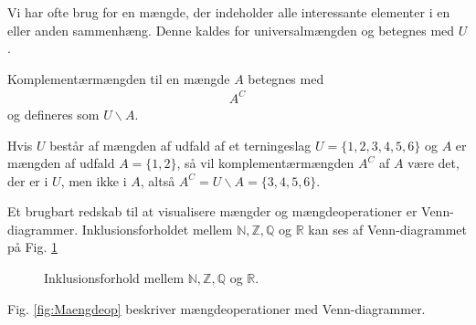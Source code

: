 Vi har ofte brug for en mængde, der indeholder alle interessante elementer i en eller anden sammenhæng. Denne kaldes for universalmængden og betegnes med $U$. 
\begin{defn}
Komplementærmængden til en mængde $A$ betegnes med 
\begin{align*}
A^C 
\end{align*}
og defineres som $U\backslash A$. 
\end{defn}
\begin{exa}
Hvis $U$ består af mængden af udfald af et terningeslag $U=\{1,2,3,4,5,6\}$ og $A$ er mængden af udfald $A=\{1,2\}$, så vil komplementærmængden $A^C$ af $A$ være det, der er i $U$, men ikke i $A$, altså $A^C = U\backslash A = \{3,4,5,6\}$.
\end{exa}
Et brugbart redskab til at visualisere mængder og mængdeoperationer er Venn-diagrammer. Inklusionsforholdet mellem $\mathbb{N}, \mathbb{Z}, \mathbb{Q}$ og $\mathbb{R}$ kan ses af Venn-diagrammet på Fig. \ref{fig:venn1}
\begin{figure}[H]
\centering
{}
\caption{Inklusionsforhold mellem $\mathbb{N},\mathbb{Z},\mathbb{Q}$ og $\mathbb{R}$.}
\label{fig:venn1}
\end{figure}
Fig. \ref{fig:Maengdeop} beskriver mængdeoperationer med Venn-diagrammer. 
